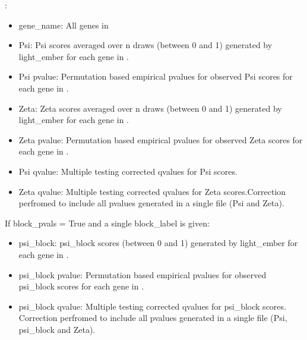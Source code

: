 \documentclass[letterpaper,10pt,english]{sphinxmanual}
\begin{document}
\begin{fulllineitems}
\begin{itemize}
\end{itemize}

\sphinxAtStartPar
{}:
\begin{itemize}
\item {} 
\sphinxAtStartPar
gene\_name: All genes in 

\item {} 
\sphinxAtStartPar
Psi: Psi scores averaged over n draws (between 0 and 1) generated by light\_ember for each gene in .

\item {} 
\sphinxAtStartPar
Psi p\sphinxhyphen{}value: Permutation based empirical p\sphinxhyphen{}values for observed Psi scores for each gene in .

\item {} 
\sphinxAtStartPar
Zeta: Zeta scores averaged over n draws (between 0 and 1) generated by light\_ember for each gene in .

\item {} 
\sphinxAtStartPar
Zeta p\sphinxhyphen{}value: Permutation based empirical p\sphinxhyphen{}values for observed Zeta scores for each gene in .

\item {} 
\sphinxAtStartPar
Psi q\sphinxhyphen{}value: Multiple testing corrected q\sphinxhyphen{}values for Psi scores.

\item {} 
\sphinxAtStartPar
Zeta q\sphinxhyphen{}value: Multiple testing corrected q\sphinxhyphen{}values for Zeta scores.Correction perfromed to include all p\sphinxhyphen{}values generated in a single file (Psi and Zeta).

\end{itemize}

\sphinxAtStartPar
If block\_pvals = True and a single block\_label is given:
\begin{itemize}
\item {} 
\sphinxAtStartPar
psi\_block: psi\_block scores (between 0 and 1) generated by light\_ember for each gene in .

\item {} 
\sphinxAtStartPar
psi\_block p\sphinxhyphen{}value: Permutation based empirical p\sphinxhyphen{}values for observed psi\_block scores for each gene in .

\item {} 
\sphinxAtStartPar
psi\_block q\sphinxhyphen{}value: Multiple testing corrected q\sphinxhyphen{}values for psi\_block scores. Correction perfromed to include all p\sphinxhyphen{}values generated in a single file (Psi, psi\_block and Zeta).

\end{itemize}

\end{fulllineitems}
\end{document}
